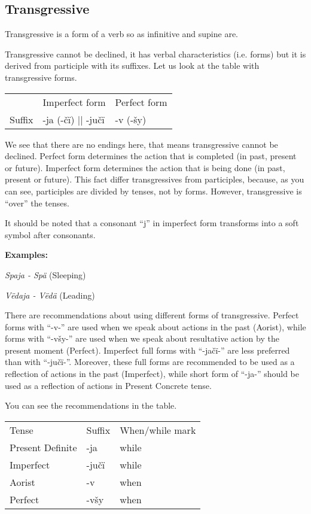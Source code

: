 \subsection{Transgressive}

Transgressive is a form of a verb so as infinitive and supine are.

Transgressive cannot be declined, it has verbal characteristics (i.e. forms) but it is derived from participle with its suffixes. Let us look at the table with transgressive forms.

\begin{table}[!htb]
	\begin{tabular}{lll}
		& Imperfect form & Perfect form \\
		Suffix & -ja (-čï) || -jučï & -v (-šy)
	\end{tabular}
\end{table}

We see that there are no endings here, that means transgressive cannot be declined. Perfect form determines the action that is completed (in past, present or future). Imperfect form determines the action that is being done (in past, present or future). This fact differ transgressives from participles, because, as you can see, participles are divided by tenses, not by forms. However, transgressive is “over” the tenses. 

It should be noted that a consonant “j” in imperfect form transforms into a soft symbol after consonants. 

\textbf{Examples:}

\textit{Spaja - Spä} (Sleeping)

\textit{Vëdaja - Vëdä} (Leading)

There are recommendations about using different forms of transgressive. Perfect forms with “-v-” are used when we speak about actions in the past (Aorist), while forms with “-všy-” are used when we speak about resultative action by the present moment (Perfect). Imperfect full forms with “-jačï-” are less preferred than with “-jučï-”. Moreover, these full forms are recommended to be used as a reflection of actions in the past (Imperfect), while short form of “-ja-” should be used as a reflection of actions in Present Concrete tense.

You can see the recommendations in the table.

\begin{table}[!htb]
	\begin{tabular}{lll}
		Tense & Suffix & When/while mark \\
		Present Definite & -ja & while \\
		Imperfect & -jučï & while \\
		Aorist & -v & when \\
		Perfect & -všy & when
	\end{tabular}
\end{table}

